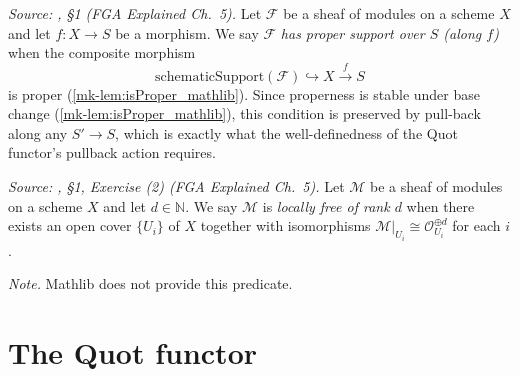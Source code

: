 \begin{definition}\label{mk-def:has_proper_support}
  \leanok

  \textit{Source: \cite{nitsure-hilbert-quot}, \S 1 (FGA Explained Ch.~5).}
  Let \(\mathcal{F}\) be a sheaf of modules on a scheme \(X\) and let
  \(f : X \to S\) be a morphism. We say \(\mathcal{F}\) \emph{has proper support
  over \(S\) (along \(f\))} when the composite morphism
  \[
    \mathrm{schematicSupport}(\mathcal{F}) \hookrightarrow X \xrightarrow{f} S
  \]
  is proper (\ref{mk-lem:isProper_mathlib}). Since properness is stable under base
  change (\ref{mk-lem:isProper_mathlib}), this condition is preserved by pull-back
  along any \(S'\to S\), which is exactly what the well-definedness of the Quot
  functor's pullback action requires.
\end{definition}

\begin{definition}\label{mk-def:is_locally_free_of_rank}
  \leanok

  \textit{Source: \cite{nitsure-hilbert-quot}, \S 1, Exercise (2) (FGA Explained Ch.~5).}
  Let \(\mathcal{M}\) be a sheaf of modules on a scheme \(X\) and let
  \(d \in \mathbb{N}\). We say \(\mathcal{M}\) is \emph{locally free of rank
  \(d\)} when there exists an open cover \(\{U_i\}\) of \(X\) together with
  isomorphisms \(\mathcal{M}|_{U_i} \cong \mathcal{O}_{U_i}^{\oplus d}\) for
  each \(i\).

  \emph{Note.} Mathlib does not provide this predicate.
\end{definition}

\section{The Quot functor}
\label{mk-sec:quot_functor}

